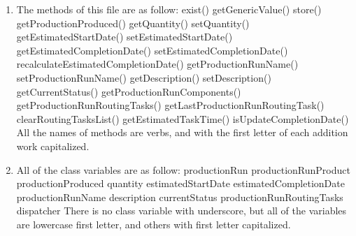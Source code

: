 \documentclass{article}
\begin{document}
\begin{enumerate}
\item
The methods of this file are as follow:\newline
exist()\newline
getGenericValue()\newline
store()\newline
getProductionProduced()\newline
getQuantity()\newline
setQuantity()\newline
getEstimatedStartDate()\newline
setEstimatedStartDate()\newline
getEstimatedCompletionDate()\newline
setEstimatedCompletionDate()\newline
recalculateEstimatedCompletionDate()\newline
getProductionRunName()\newline
setProductionRunName()\newline
getDescription()\newline
setDescription()\newline
getCurrentStatus()\newline
getProductionRunComponents()\newline
getProductionRunRoutingTasks()\newline
getLastProductionRunRoutingTask()\newline
clearRoutingTasksList()\newline
getEstimatedTaskTime()\newline
isUpdateCompletionDate()\newline
All the names of methods are verbs, and with the first letter of each addition work capitalized.

\item
All of the class variables are as follow:\newline
productionRun\newline
productionRunProduct\newline
productionProduced\newline
quantity\newline
estimatedStartDate\newline
estimatedCompletionDate\newline
productionRunName\newline
description\newline
currentStatus\newline
productionRunRoutingTasks\newline
dispatcher\newline
There is no class variable with underscore, but all of the variables are lowercase first letter, and others with first letter capitalized.


\end{enumerate}
\end{document}
